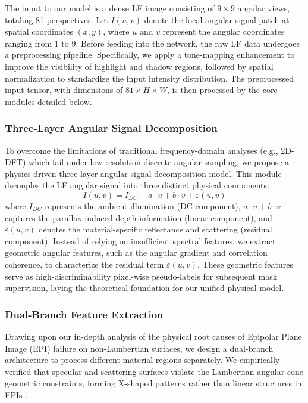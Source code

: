 \documentclass[lettersize,journal]{IEEEtran}
\begin{document}
The input to our model is a dense LF image consisting of $9 \times 9$ angular views, totaling 81 perspectives. Let $I(u,v)$ denote the local angular signal patch at spatial coordinates $(x,y)$, where $u$ and $v$ represent the angular coordinates ranging from 1 to 9. Before feeding into the network, the raw LF data undergoes a preprocessing pipeline. Specifically, we apply a tone-mapping enhancement to improve the visibility of highlight and shadow regions, followed by spatial normalization to standardize the input intensity distribution. The preprocessed input tensor, with dimensions of $81 \times H \times W$, is then processed by the core modules detailed below.

\subsubsection{Three-Layer Angular Signal Decomposition}
To overcome the limitations of traditional frequency-domain analyses (e.g., 2D-DFT) which fail under low-resolution discrete angular sampling, we propose a physics-driven three-layer angular signal decomposition model. This module decouples the LF angular signal into three distinct physical components:
\begin{equation}
I(u,v) = I_{DC} + a \cdot u + b \cdot v + \varepsilon(u,v)
\label{eq:ch3_1}
\end{equation}
where $I_{DC}$ represents the ambient illumination (DC component), $a \cdot u + b \cdot v$ captures the parallax-induced depth information (linear component), and $\varepsilon(u,v)$ denotes the material-specific reflectance and scattering (residual component). Instead of relying on insufficient spectral features, we extract geometric angular features, such as the angular gradient and correlation coherence, to characterize the residual term $\varepsilon(u,v)$. These geometric features serve as high-discriminability pixel-wise pseudo-labels for subsequent mask supervision, laying the theoretical foundation for our unified physical model.

\subsubsection{Dual-Branch Feature Extraction}
Drawing upon our in-depth analysis of the physical root causes of Epipolar Plane Image (EPI) failure on non-Lambertian surfaces, we design a dual-branch architecture to process different material regions separately. We empirically verified that specular and scattering surfaces violate the Lambertian angular cone geometric constraints, forming X-shaped patterns rather than linear structures in EPIs \cite{wang2024dualbranch}. 
\end{document}
